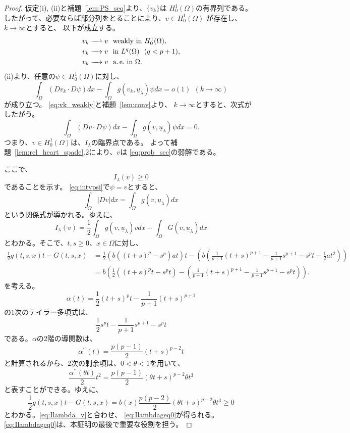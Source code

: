 \begin{proof}
 仮定(i), (ii)と補題~\ref{lem:PS_seq}より、$\{v_k \}$は
 $H_0^1(\Omega)$の有界列である。
 したがって、必要ならば部分列をとることにより、$v \in H_0^1(\Omega)$
 が存在し、$k \to \infty$とすると、
 以下が成立する。
 \begin{align}
  v_k \xrightharpoonup{ \mbox{ ~ } } v & \ \ \text{weakly~} \tin
  H_0^1(\Omega), \label{eq:vk_weakly} \\
  v_k \xrightarrow{ \mbox{ ~ } } v & \ \ \tin L^q(\Omega) \ \
   (q < p+1), \label{eq:vk_Lq} \\
  v_k \xrightarrow{ \mbox{ ~ } } v & \ \ \ae \tin \Omega. 
    \label{eq:vk_ae}
 \end{align}
 (ii)より、任意の$\psi \in H_0^1(\Omega)$に対し、
 \[
 \int_\Omega (Dv_k \cdot D\psi) dx - \int_\Omega g(v_k,
 \underline{u}_\lambda) \psi dx = o(1) \ \ (k \to \infty)
 \]
 が成り立つ。
 \eqref{eq:vk_weakly}と補題~\ref{lem:conv}より、
 $k \to \infty$とすると、次式がしたがう。
 \begin{equation}
  \int_\Omega (Dv \cdot D\psi) dx - \int_\Omega g(v,
   \underline{u}_\lambda) \psi dx = 0. \label{eq:intvpsi}
 \end{equation}
 つまり、$v \in H_0^1(\Omega)$は、$I_\lambda$の臨界点である。
 よって補題~\ref{lem:rel_heart_spade}.2により、$v$は
 \ref{eq:prob_sec}の弱解である。

 ここで、
 \begin{equation}
  I_\lambda(v) \geq 0 \label{eq:Ilambdageq0}
 \end{equation}
 であることを示す。
 \eqref{eq:intvpsi}で$\psi = v$とすると、
 \[
  \int_\Omega \lvert Dv \rvert dx = \int_\Omega g(v,
 \underline{u}_\lambda)  dx
 \]
 という関係式が導かれる。ゆえに、
 \begin{equation}
  I_\lambda (v) = \frac{1}{2} \int_\Omega g(v, \underline{u}_\lambda)
   v dx - \int_\Omega G(v, \underline{u}_\lambda) dx \label{eq:Ilambda_v}
 \end{equation}
 とわかる。そこで、$t, s \geq 0$、$x \in \Omega$に対し、
 \begin{align*}
  \frac{1}{2} g(t, s, x) t - G(t, s, x) &= \frac{1}{2} \left(b \left(
  (t+s)^p - s^p \right) at \right)t - \left( b \left(
  \frac{1}{p+1}(t+s)^{p+1} - \frac{1}{p+1}s^{p+1} - s^p t -
  \frac{1}{2}at^2  \right) \right) \\
  &= b \left( \frac{1}{2} \left( (t+s)^pt - s^pt \right) -\left(
  \frac{1}{p+1} (t+s)^{p+1} - \frac{1}{p+1} s^{p+1} - s^p t \right) \right).
 \end{align*}
 を考える。
 \[
  \alpha(t) = \frac{1}{2} (t+s)^p t - \frac{1}{p+1}(t+s)^{p+1}
 \]
 の$1$次のテイラー多項式は、
 \[
  \frac{1}{2} s^p t - \frac{1}{p+1}s^{p+1} - s^p t
 \]
 である。$\alpha$の$2$階の導関数は、
 \[
  \alpha^{\prime\prime}(t) = \frac{p(p-1)}{2}(t+s)^{p-2}t
 \]
 と計算されるから、$2$次の剰余項は、$0 < \theta < 1$を用いて、
 \[
  \frac{\alpha^{\prime\prime}(\theta t)}{2} t^2 =
 \frac{p(p-1)}{2}(\theta t + s)^{p-2} \theta t^3
 \]
 と表すことができる。ゆえに、
 \[
  \frac{1}{2} g(t, s, x)t - G(t, s, x) = b(x) \frac{p(p-2)}{2} (\theta
 t + s)^{p-2} \theta t^3 \geq 0
 \]
 とわかる。\eqref{eq:Ilambda_v}と合わせ、
 \eqref{eq:Ilambdageq0}が得られる。
 \eqref{eq:Ilambdageq0}は、本証明の最後で重要な役割を担う。


\end{proof}
